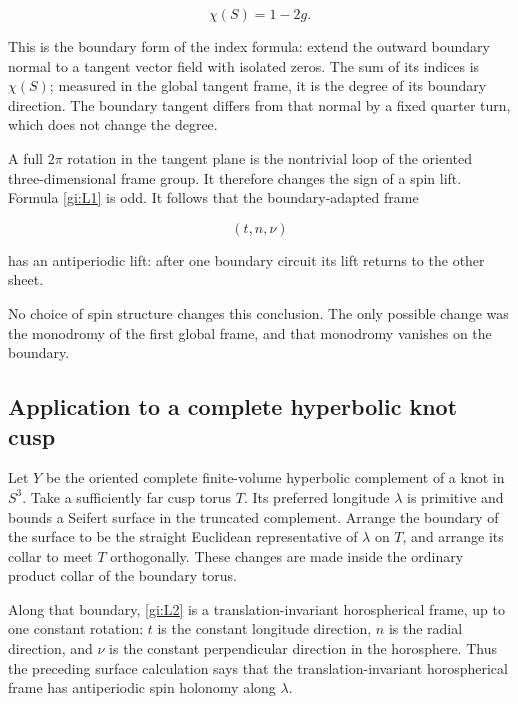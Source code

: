 \begin{equation}\label{gi:L1}
\chi(S)=1-2g.
\end{equation}

This is the boundary form of the index formula: extend the outward
boundary normal to a tangent vector field with isolated zeros.
The sum of its indices is \(\chi(S)\); measured in the
global tangent frame, it is the degree of its boundary direction.
The boundary tangent differs from that normal by a fixed quarter
turn, which does not change the degree.

A full \(2\pi\) rotation in the tangent plane is the nontrivial
loop of the oriented three-dimensional frame group. It therefore
changes the sign of a spin lift. Formula \eqref{gi:L1} is odd. It follows
that the boundary-adapted frame

\begin{equation}\label{gi:L2}
(t,n,\nu)
\end{equation}

has an antiperiodic lift: after one boundary circuit its lift
returns to the other sheet.

No choice of spin structure changes this conclusion. The only
possible change was the monodromy of the first global frame,
and that monodromy vanishes on the boundary.

\subsection{Application to a complete hyperbolic knot cusp}\label{gi:application-to-a-complete-hyperbolic-knot-cusp}

Let \(Y\) be the oriented complete finite-volume hyperbolic complement
of a knot in \(S^3\). Take a sufficiently far cusp torus \(T\).
Its preferred longitude \(\lambda\) is primitive and bounds
a Seifert surface in the truncated complement.
Arrange the boundary of the surface to be the straight Euclidean
representative of \(\lambda\) on \(T\), and arrange its
collar to meet \(T\) orthogonally. These changes are made
inside the ordinary product collar of the boundary torus.

Along that boundary, \eqref{gi:L2} is a translation-invariant horospherical frame, up to
one constant rotation: \(t\) is the constant longitude
direction, \(n\) is the radial direction, and \(\nu\)
is the constant perpendicular direction in the horosphere.
Thus the preceding surface calculation says that the translation-invariant horospherical frame has
antiperiodic spin holonomy along \(\lambda\).

